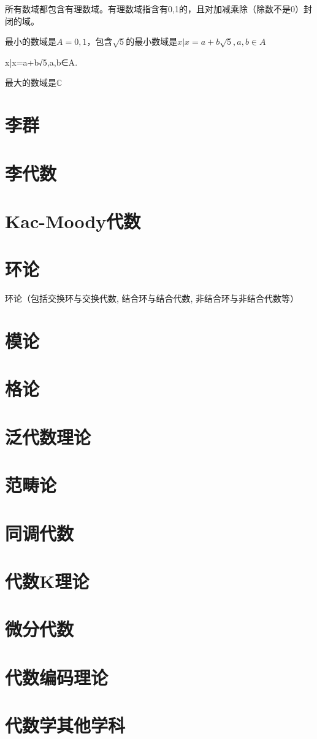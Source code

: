 \documentclass[UTF8]{../09-Mathematics}
\begin{document}
所有数域都包含有理数域。有理数域指含有0,1的，且对加减乘除（除数不是0）封闭的域。

最小的数域是$A = {0,1}$，包含$\sqrt{5}$的最小数域是$ x| x = a + b\sqrt{5}, a , b \in A$

{x|x=a+b√5,a,b∈A}.


最大的数域是$\mathbb{C}$


\chapter{李群}
\chapter{李代数}
\chapter{Kac-Moody代数}
\chapter{环论}
环论（包括交换环与交换代数, 结合环与结合代数, 非结合环与非结合代数等）
\chapter{模论}
\chapter{格论}
\chapter{泛代数理论}
\chapter{范畴论}
\chapter{同调代数}
\chapter{代数K理论}
\chapter{微分代数}
\chapter{代数编码理论}
\chapter{代数学其他学科}
\end{document}
